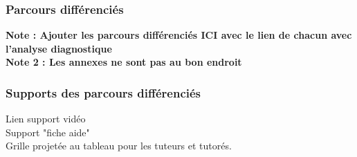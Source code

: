 \subsubsection*{Parcours différenciés}\label{parcours_diff3}
\textbf{\color{red} Note : Ajouter les parcours différenciés ICI avec le lien de chacun avec l'analyse diagnostique\\
Note 2 : Les annexes ne sont pas au bon endroit}
\subsubsection*{Supports des parcours différenciés}
Lien support vidéo\\
Support "fiche aide"\\
Grille projetée au tableau pour les tuteurs et tutorés.